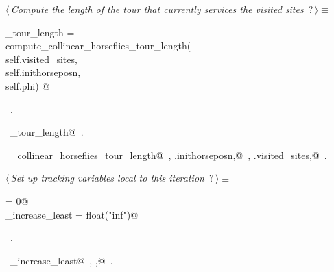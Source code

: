 \documentclass[11.5pt]{report}
\begin{document}
\begin{flushleft} \small\label{scrap36}\raggedright\small
{} $\langle\,${\itshape Compute the length of the tour that currently services the visited sites}\nobreak\ {\footnotesize {?}}$\,\rangle\equiv$
\vspace{-1ex}
\begin{list}{}{} \item
\mbox{}\verb@current_tour_length    = \@\\
\mbox{}\verb@         compute_collinear_horseflies_tour_length(\@\\
\mbox{}\verb@                    self.visited_sites,\@\\
\mbox{}\verb@                    self.inithorseposn,\@\\
\mbox{}\verb@                    self.phi) @\\
\mbox{}\verb@@{\NWsep}
\end{list}
\vspace{-1.5ex}
\footnotesize
\begin{list}{}{\setlength{\itemsep}{-\parsep}\setlength{\itemindent}{-\leftmargin}}
\item \NWtxtMacroRefIn\ .
\item \NWtxtIdentsDefed\nobreak\  \verb@current_tour_length@\nobreak\ .\item \NWtxtIdentsUsed\nobreak\  \verb@compute_collinear_horseflies_tour_length@\nobreak\ , \verb@self.inithorseposn,@\nobreak\ , \verb@self.visited_sites,@\nobreak\ .
\item{}
\end{list}
\vspace{4ex}
\end{flushleft}
\newchunk 
\begin{flushleft} \small\label{scrap37}\raggedright\small
{} $\langle\,${\itshape Set up tracking variables local to this iteration}\nobreak\ {\footnotesize {?}}$\,\rangle\equiv$
\vspace{-1ex}
\begin{list}{}{} \item
\mbox{}\verb@ibest                = 0@\\
\mbox{}\verb@delta_increase_least = float("inf")@\\
\mbox{}\verb@@{\NWsep}
\end{list}
\vspace{-1.5ex}
\footnotesize
\begin{list}{}{\setlength{\itemsep}{-\parsep}\setlength{\itemindent}{-\leftmargin}}
\item \NWtxtMacroRefIn\ .
\item \NWtxtIdentsDefed\nobreak\  \verb@delta_increase_least@\nobreak\ , \verb@ibest,@\nobreak\ .
\item{}
\end{list}
\vspace{4ex}
\end{flushleft}
\end{document}
